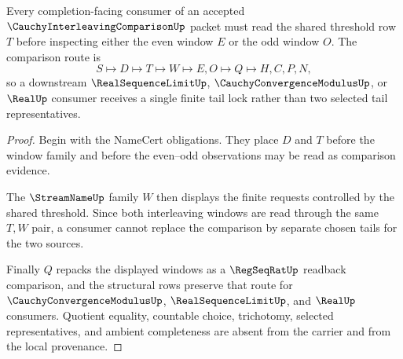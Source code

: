 \begin{theorem}
\label{thm:cauchy-interleaving-comparison-tail-lock}
Every completion-facing consumer of an accepted $\CauchyInterleavingComparisonUp$ packet must read the shared threshold row $T$ before inspecting either the even window $E$ or the odd window $O$. The comparison route is
$$
S\longmapsto D\longmapsto T\longmapsto W\longmapsto E,O\longmapsto Q\longmapsto H,C,P,N,
$$
so a downstream $\RealSequenceLimitUp$, $\CauchyConvergenceModulusUp$, or $\RealUp$ consumer receives a single finite tail lock rather than two selected tail representatives.
\end{theorem}
\begin{proof}
Begin with the NameCert obligations. They place $D$ and $T$ before the window family and before the even--odd observations may be read as comparison evidence.

The $\StreamNameUp$ family $W$ then displays the finite requests controlled by the shared threshold. Since both interleaving windows are read through the same $T,W$ pair, a consumer cannot replace the comparison by separate chosen tails for the two sources.

Finally $Q$ repacks the displayed windows as a $\RegSeqRatUp$ readback comparison, and the structural rows preserve that route for $\CauchyConvergenceModulusUp$, $\RealSequenceLimitUp$, and $\RealUp$ consumers. Quotient equality, countable choice, trichotomy, selected representatives, and ambient completeness are absent from the carrier and from the local provenance.
\end{proof}




